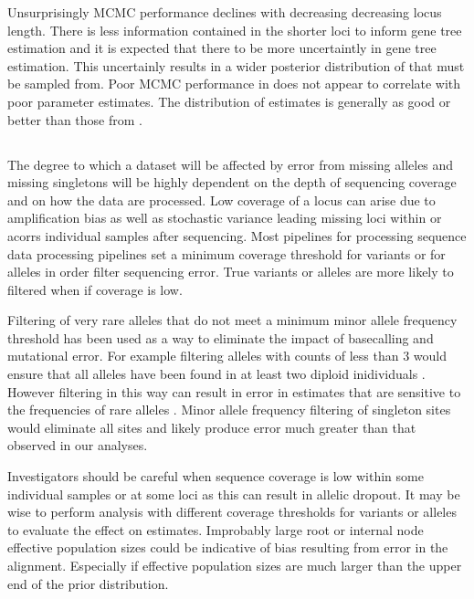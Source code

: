 Unsurprisingly MCMC performance declines with decreasing decreasing locus length.
There is less information contained in the shorter loci to inform gene tree estimation 
and it is expected that there to be more uncertaintly in gene tree estimation.
This uncertainly results in a wider posterior distribution of that must be 
sampled from.
Poor MCMC performance in \beast does not appear to correlate with poor parameter 
estimates. The distribution of estimates is generally as good or better than those 
from \ecoevolity. 


\subsection{}
The degree to which a dataset will be affected by error from missing alleles 
and missing singletons will be highly dependent on the depth of sequencing coverage
and on how the data are processed. 
Low coverage of a locus can arise due to amplification bias as well as 
stochastic variance leading missing loci within or acorrs individual samples 
after sequencing.
Most pipelines for processing sequence data processing pipelines set 
a minimum coverage threshold for variants or for alleles in order filter
sequencing error. True variants or alleles are more likely to filtered when
if coverage is low. 

Filtering of very rare alleles that do not meet a minimum minor allele 
frequency threshold has been used as a way to eliminate the impact of 
basecalling and mutational error. 
For example filtering alleles with counts of less than 3 would ensure that all alleles have been 
found in at least two diploid inidividuals \citep{rochetteStacksAnalyticalMethods2019}.
However filtering in this way can result in error in estimates that are 
sensitive to the frequencies of rare alleles \citep{linckMinorAlleleFrequency2019}.
Minor allele frequency filtering of singleton sites would eliminate all sites 
and likely produce error much greater than that observed in our analyses.


Investigators should be careful when sequence coverage is low within some
individual samples or at some loci as this can result in allelic dropout.
It may be wise to perform analysis with different coverage thresholds for 
variants or alleles to evaluate the effect on estimates. 
Improbably large root or internal node effective population sizes could be 
indicative of bias resulting from error in the alignment. Especially if effective 
population sizes are much larger than the upper end of the prior distribution. 

